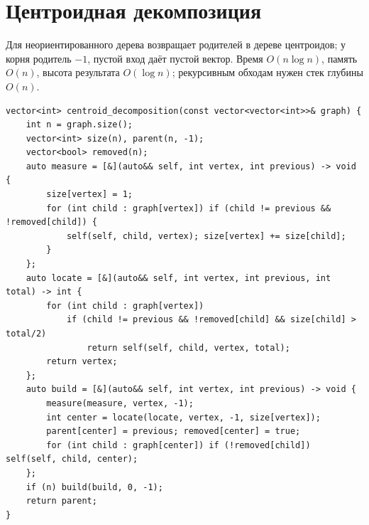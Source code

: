 %

\section{Центроидная декомпозиция}
Для неориентированного дерева возвращает родителей в дереве центроидов; у корня родитель $-1$, пустой вход даёт пустой вектор.
Время $O(n\log n)$, память $O(n)$, высота результата $O(\log n)$; рекурсивным обходам нужен стек глубины $O(n)$.
\begin{lstlisting}[name=centroid_decomposition]
vector<int> centroid_decomposition(const vector<vector<int>>& graph) {
    int n = graph.size();
    vector<int> size(n), parent(n, -1);
    vector<bool> removed(n);
    auto measure = [&](auto&& self, int vertex, int previous) -> void {
        size[vertex] = 1;
        for (int child : graph[vertex]) if (child != previous && !removed[child]) {
            self(self, child, vertex); size[vertex] += size[child];
        }
    };
    auto locate = [&](auto&& self, int vertex, int previous, int total) -> int {
        for (int child : graph[vertex])
            if (child != previous && !removed[child] && size[child] > total/2)
                return self(self, child, vertex, total);
        return vertex;
    };
    auto build = [&](auto&& self, int vertex, int previous) -> void {
        measure(measure, vertex, -1);
        int center = locate(locate, vertex, -1, size[vertex]);
        parent[center] = previous; removed[center] = true;
        for (int child : graph[center]) if (!removed[child]) self(self, child, center);
    };
    if (n) build(build, 0, -1);
    return parent;
}
\end{lstlisting}
%

